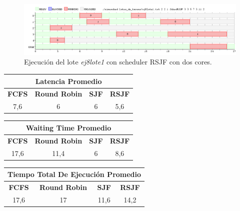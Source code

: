\begin{figure}[!h]
	\begin{center}
		\includegraphics[width=500px]{imagenes/ej8_prueba1_rsjf2.png}
		\caption{Ejecución del lote \emph{ej8lote1} con scheduler RSJF con dos cores.}
		\label{fig:grafico_ej8_prueba1_rsjf2}
	\end{center}
\end{figure}

\begin{center}
	\begin{tabular}{|c|c|c|c|}
		\hline
		\multicolumn{4}{|c|}{\large{\textbf{Latencia Promedio}}} \\
		\hline
		\textbf{FCFS} & \textbf{Round Robin} & \textbf{SJF} & \textbf{RSJF} \\
		\hline
		7,6 & 6 & 6 & 5,6 \\
		\hline
	\end{tabular}
\end{center}

\begin{center}
	\begin{tabular}{|c|c|c|c|}
		\hline
		\multicolumn{4}{|c|}{\large{\textbf{Waiting Time Promedio}}} \\
		\hline
		\textbf{FCFS} & \textbf{Round Robin} & \textbf{SJF} & \textbf{RSJF} \\
		\hline
		17,6 & 11,4 & 6 & 8,6 \\
		\hline
	\end{tabular}
\end{center}

\begin{center}
	\begin{tabular}{|c|c|c|c|}
		\hline
		\multicolumn{4}{|c|}{\large{\textbf{Tiempo Total De Ejecución Promedio}}} \\
		\hline
		\textbf{FCFS} & \textbf{Round Robin} & \textbf{SJF} & \textbf{RSJF} \\
		\hline
		17,6 & 17 & 11,6 & 14,2 \\
		\hline
	\end{tabular}
\end{center}

